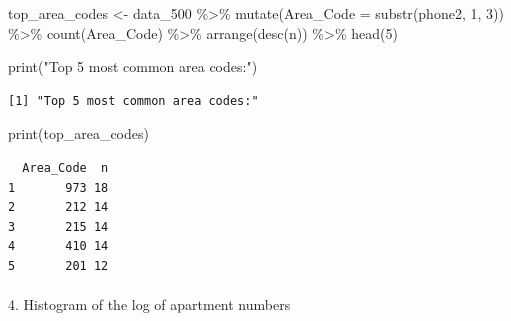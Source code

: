 \documentclass[
  12pt,
]{article}
\makeatletter
\let\oldparagraph\paragraph
\renewcommand{\paragraph}{
    \@ifstar
      \xxxParagraphStar
      \xxxParagraphNoStar
  }
\newcommand{\xxxParagraphStar}[1]{\oldparagraph*{#1}\mbox{}}
\newcommand{\xxxParagraphNoStar}[1]{\oldparagraph{#1}\mbox{}}
\newenvironment{Shaded}{\begin{snugshade}}{\end{snugshade}}
\newcommand{\AttributeTok}[1]{\textcolor[rgb]{0.40,0.45,0.13}{#1}}
\newcommand{\DecValTok}[1]{\textcolor[rgb]{0.68,0.00,0.00}{#1}}
\newcommand{\FunctionTok}[1]{\textcolor[rgb]{0.28,0.35,0.67}{#1}}
\newcommand{\NormalTok}[1]{\textcolor[rgb]{0.00,0.23,0.31}{#1}}
\newcommand{\OtherTok}[1]{\textcolor[rgb]{0.00,0.23,0.31}{#1}}
\newcommand{\SpecialCharTok}[1]{\textcolor[rgb]{0.37,0.37,0.37}{#1}}
\newcommand{\StringTok}[1]{\textcolor[rgb]{0.13,0.47,0.30}{#1}}
\makeatother
\begin{document}
\begin{Shaded}
\begin{Highlighting}[]
\NormalTok{top\_area\_codes }\OtherTok{\textless{}{-}}\NormalTok{ data\_500 }\SpecialCharTok{\%\textgreater{}\%}
  \FunctionTok{mutate}\NormalTok{(}\AttributeTok{Area\_Code =} \FunctionTok{substr}\NormalTok{(phone2, }\DecValTok{1}\NormalTok{, }\DecValTok{3}\NormalTok{)) }\SpecialCharTok{\%\textgreater{}\%}  
  \FunctionTok{count}\NormalTok{(Area\_Code) }\SpecialCharTok{\%\textgreater{}\%}                         
  \FunctionTok{arrange}\NormalTok{(}\FunctionTok{desc}\NormalTok{(n)) }\SpecialCharTok{\%\textgreater{}\%}                        
  \FunctionTok{head}\NormalTok{(}\DecValTok{5}\NormalTok{)                                      }

\FunctionTok{print}\NormalTok{(}\StringTok{"Top 5 most common area codes:"}\NormalTok{)}
\end{Highlighting}
\end{Shaded}

\begin{verbatim}
[1] "Top 5 most common area codes:"
\end{verbatim}

\begin{Shaded}
\begin{Highlighting}[]
\FunctionTok{print}\NormalTok{(top\_area\_codes)}
\end{Highlighting}
\end{Shaded}

\begin{verbatim}
  Area_Code  n
1       973 18
2       212 14
3       215 14
4       410 14
5       201 12
\end{verbatim}

\paragraph{4. Histogram of the log of apartment
numbers}\label{histogram-of-the-log-of-apartment-numbers}

\begin{Shaded}
\end{Shaded}
\end{document}
